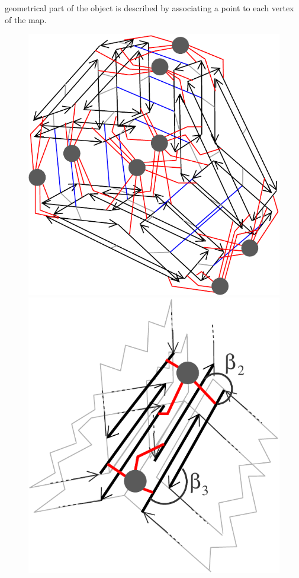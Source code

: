 geometrical part of the object is described by associating a point to
each vertex of the map.
%
\def\LargFig{.3\textwidth}
\begin{figure}[h]
  \begin{ccTexOnly}
    \begin{center}
      \includegraphics[width=\LargFig]{Linear_cell_complex/fig/pdf/intuitif-example-lcc}\qquad
      \includegraphics[width=\LargFig]{Linear_cell_complex/fig/pdf/intuitif-example-lcc-zoom}

\end{center}
\end{ccTexOnly}
\end{figure}
